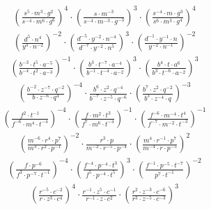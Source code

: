 \begin{align}
\left(\frac{s^{5}\cdot m^{3}\cdot g^{2}}{s^{-4}\cdot m^{6}\cdot g^{6}}\right)^{4}\cdot \left(\frac{s\cdot m^{-3}}{s^{-4}\cdot m^{-3}\cdot g^{-3}}\right)^{3}\cdot \left(\frac{s^{-4}\cdot m\cdot g^{3}}{s^{6}\cdot m^{3}\cdot g^{4}}\right)^{4}
\end{align}
\begin{align}
\left(\frac{d^{5}\cdot n^{4}}{y^{3}\cdot n^{-2}}\right)^{-2}\cdot \left(\frac{d^{-5}\cdot y^{-2}\cdot n^{-4}}{d^{-7}\cdot y^{-2}\cdot n^{5}}\right)^{3}\cdot \left(\frac{d^{-1}\cdot y^{-1}\cdot n}{y^{-2}\cdot n^{-1}}\right)^{-2}
\end{align}
\begin{align}
\left(\frac{b^{-3}\cdot t^{5}\cdot a^{-5}}{b^{-4}\cdot t^{2}\cdot a^{-3}}\right)^{-1}\cdot \left(\frac{b^{3}\cdot t^{-7}\cdot a^{-4}}{b^{-1}\cdot t^{-4}\cdot a^{-2}}\right)^{3}\cdot \left(\frac{b^{4}\cdot t\cdot a^{6}}{b^{3}\cdot t^{-6}\cdot a^{-2}}\right)^{3}
\end{align}
\begin{align}
\left(\frac{b^{-2}\cdot z^{-7}\cdot q^{-2}}{b\cdot z^{-6}\cdot q^{4}}\right)^{-4}\cdot \frac{b^{6}\cdot z^{2}\cdot q^{-4}}{b^{-7}\cdot z^{-5}\cdot q^{-6}}\cdot \left(\frac{b^{7}\cdot z^{2}\cdot q^{-2}}{b^{3}\cdot z^{-4}\cdot q}\right)^{-3}
\end{align}
\begin{align}
\left(\frac{f^{2}\cdot t^{-1}}{f^{-6}\cdot m^{4}\cdot t^{-4}}\right)^{-4}\cdot \left(\frac{f\cdot m^{2}\cdot t^{3}}{f^{7}\cdot m^{6}\cdot t^{-4}}\right)^{-1}\cdot \left(\frac{f^{-6}\cdot m^{-4}\cdot t^{4}}{f^{-7}\cdot m^{-2}\cdot t^{-3}}\right)^{-1}
\end{align}
\begin{align}
\left(\frac{m^{-6}\cdot r^{4}\cdot p^{7}}{m^{3}\cdot r^{2}\cdot p^{-1}}\right)^{-2}\cdot \frac{r^{3}\cdot p}{m^{-2}\cdot r^{-5}\cdot p^{-4}}\cdot \left(\frac{m^{4}\cdot r^{-1}\cdot p^{7}}{m^{-4}\cdot r\cdot p^{-5}}\right)^{2}
\end{align}
\begin{align}
\left(\frac{f\cdot p^{-6}}{f^{3}\cdot p^{-7}\cdot t^{-1}}\right)^{-4}\cdot \left(\frac{f^{-4}\cdot p^{-4}\cdot t^{3}}{f^{5}\cdot p^{-4}\cdot t^{5}}\right)^{3}\cdot \left(\frac{f^{-1}\cdot p^{-5}\cdot t^{-7}}{p^{7}\cdot t^{-1}}\right)^{-2}
\end{align}
\begin{align}
\left(\frac{r^{-5}\cdot c^{-2}}{r\cdot z^{3}\cdot c^{4}}\right)^{4}\cdot \frac{r^{-1}\cdot z^{5}\cdot c^{-1}}{r^{-1}\cdot z\cdot c^{2}}\cdot \left(\frac{r^{2}\cdot z^{-3}\cdot c^{-6}}{r^{3}\cdot z^{-5}\cdot c^{-3}}\right)^{3}
\end{align}
